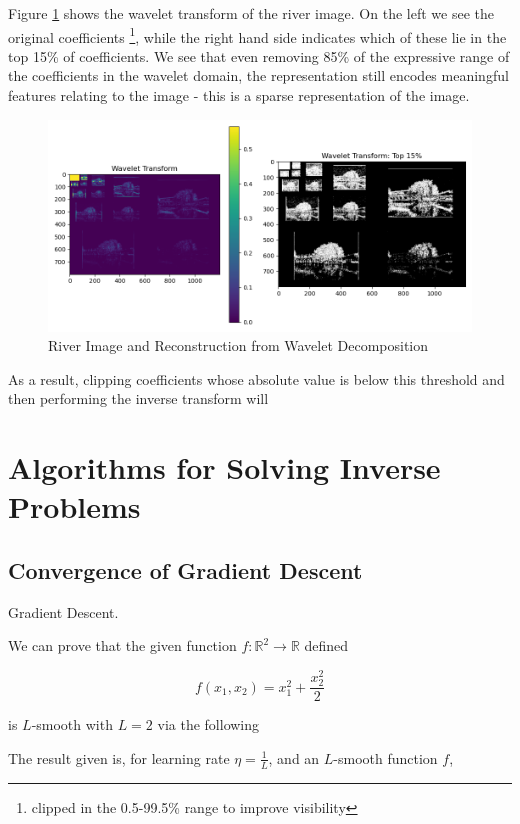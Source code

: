 \documentclass[12pt]{article}
\begin{document}
Figure \ref{fig:wavelet_transform} shows the wavelet transform of the river image.
On the left we see the original coefficients \footnote{clipped in the 0.5-99.5\% range to improve visibility},
while the right hand side indicates which of these lie in the top 15\% of coefficients.
We see that even removing 85\% of the expressive range of the coefficients in the wavelet domain,
the representation still encodes meaningful features relating to the image - this is a sparse representation of the image.

\begin{figure}[hp]
    \includegraphics[scale=0.5]{figures/wavelet_transform.png}
    \caption{River Image and Reconstruction from Wavelet Decomposition}
    \label{fig:wavelet_transform}
\end{figure}

As a result, clipping coefficients whose absolute value is below this threshold and then performing the inverse transform will



\section{Algorithms for Solving Inverse Problems}
\subsection{Convergence of Gradient Descent}

Gradient Descent.

We can prove that the given function $f:\mathbb{R}^2\rightarrow\mathbb{R}$ defined

\[f(x_1,x_2) = x_1^2 + \frac{x_2^2}{2}\]

is $L$-smooth with $L=2$ via the following

The result given is, for learning rate $\eta=\frac{1}{L}$, and an $L$-smooth function $f$,
\end{document}
